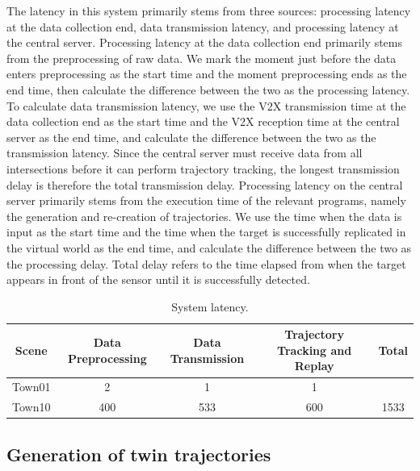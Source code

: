 \documentclass[lineno,pdflatex,sn-basic]{sn-jnl}%
\theoremstyle{thmstyleone}%
\theoremstyle{thmstyletwo}%
\theoremstyle{thmstylethree}%
\begin{document}
The latency in this system primarily stems from three sources: processing latency at the data collection end, data transmission latency, and processing latency at the central server.
Processing latency at the data collection end primarily stems from the preprocessing of raw data. We mark the moment just before the data enters preprocessing as the start time and the moment preprocessing ends as the end time, then calculate the difference between the two as the processing latency.
To calculate data transmission latency, we use the V2X transmission time at the data collection end as the start time and the V2X reception time at the central server as the end time, and calculate the difference between the two as the transmission latency.
Since the central server must receive data from all intersections before it can perform trajectory tracking, the longest transmission delay is therefore the total transmission delay.
Processing latency on the central server primarily stems from the execution time of the relevant programs, namely the generation and re-creation of trajectories.
We use the time when the data is input as the start time and the time when the target is successfully replicated in the virtual world as the end time, and calculate the difference between the two as the processing delay.
Total delay refers to the time elapsed from when the target appears in front of the sensor until it is successfully detected.


\begin{table}[htbp]
  \centering
  \caption{System latency.}
  \label{tab:algorithm_performance}

  \begin{tabular*}{\textwidth}{@{\extracolsep{\fill}}ccccc}
    \toprule
    Scene & Data Preprocessing & Data Transmission & Trajectory Tracking and Replay & Total \\
    \midrule
      Town01  & 2 & 1 & 1 &                    \\
      Town10  & 400 & 533 & 600 & 1533                   \\
    \bottomrule
  \end{tabular*}
\end{table}


\subsection{Generation of twin trajectories}
\end{document}
